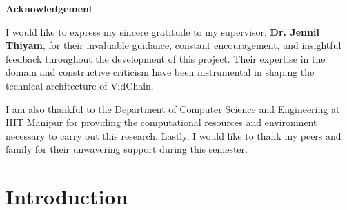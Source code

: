 \documentclass[a4paper, 11pt, oneside]{report}
\begin{document}
\newpage
\begin{abstract}
As video surveillance and digital media consumption reach unprecedented scales, the manual analysis of long-form video content has become a significant bottleneck in forensic and administrative workflows. This report presents \textbf{VidChain}, a library-grade framework designed for the automated forensic analysis and narrative synthesis of video data. VidChain integrates state-of-the-art computer vision (YOLOv8, CLIP, MobileNet), audio processing (OpenAI Whisper), and Optical Character Recognition (OCR) into a unified multimodal pipeline. 

The core innovation lies in the \textit{IRIS} (Intelligent Retrieval \& Insight System) orchestration logic, which implements temporal smoothing and multimodal synchronization to eliminate sensory hallucinations. Utilizing a Retrieval-Augmented Generation (RAG) architecture over a ChromaDB persistent vector store and a Temporal Knowledge Graph, VidChain enables users to query video content using natural language and generate high-fidelity summaries of complex scenes. For long-form content, the system employs a recursive map-reduce summarization strategy to maintain narrative continuity without exceeding LLM context limits.
\end{abstract}

\pagebreak

\begin{center}
    { \LARGE \textbf{Acknowledgement}}
\end{center}
\vspace{2cm}
I would like to express my sincere gratitude to my supervisor, \textbf{Dr. Jennil Thiyam}, for their invaluable guidance, constant encouragement, and insightful feedback throughout the development of this project. Their expertise in the domain and constructive criticism have been instrumental in shaping the technical architecture of VidChain.

I am also thankful to the Department of Computer Science and Engineering at IIIT Manipur for providing the computational resources and environment necessary to carry out this research. Lastly, I would like to thank my peers and family for their unwavering support during this semester.

\newpage
\tableofcontents
\newpage
\listoffigures
\newpage
\listoftables
\newpage
	\chapter{Introduction}
	
\end{document}
